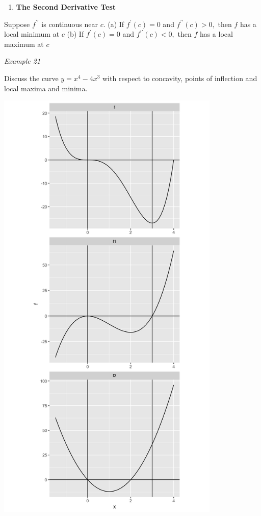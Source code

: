 \documentclass[]{book}
\providecommand{\tightlist}{%
  \setlength{\itemsep}{0pt}\setlength{\parskip}{0pt}}
\begin{document}
\begin{enumerate}
\def\labelenumi{\arabic{enumi}.}
\setcounter{enumi}{5}
\tightlist
\item
  \textbf{The Second Derivative Test}
\end{enumerate}

Suppose \(f^{\prime \prime}\) is continuous near \(c\).
(a) If \(f^\prime (c) = 0\) and \(f^{\prime \prime}(c) >0,\) then \(f\) has a local minimum at \(c\)
(b) If \(f^\prime (c) = 0\) and \(f^{\prime \prime}(c) <0,\) then \(f\) has a local maximum at \(c\)

\newpage

\emph{Example 21}

Discuss the curve \(y= x^4 - 4x^3\) with respect to concavity, points of inflection and local maxima and minima.

\newpage

\begin{center}\includegraphics[width=0.8\textwidth]{figure/unnamed-chunk-19-1} \end{center}
\end{document}
